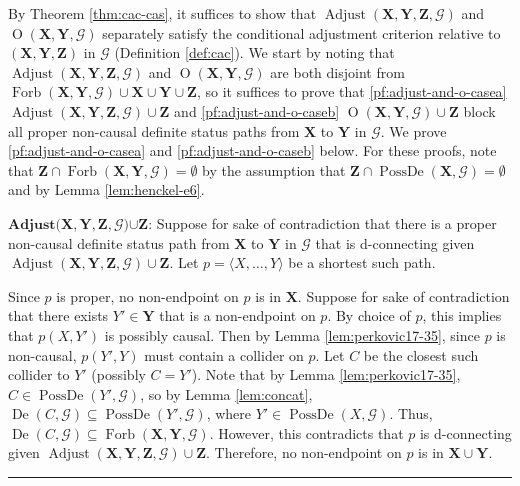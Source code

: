 \documentclass[twoside]{article}
\DeclareMathOperator{\De}{De}
\DeclareMathOperator{\PossDe}{PossDe}
\DeclareMathOperator{\Forb}{Forb}
\newcommand{\fb}[2][X,Y]{\Forb(\mb{#1},#2)}
\DeclareMathOperator{\Adjust}{Adjust}
\newcommand{\adjustb}[2][X,Y,Z]{\Adjust(\mb{#1},#2)}
\DeclareMathOperator{\Opt}{O}
\newcommand{\optb}[2][X,Y]{\Opt(\mb{#1},#2)}
\newcommand{\mb}[1]{\mathbf{#1}}
\newcommand{\g}[1][G]{\mathcal{#1}}
\newenvironment{proofof}[1][]{\begin{trivlist}
\item[\hskip \labelsep {\bfseries Proof of #1.}]}{\hfill\BlackBox\end{trivlist}}
\newcommand{\BlackBox}{\rule{1.5ex}{1.5ex}}
\begin{document}
\begin{proofof}[Theorem \ref{thm:adjust-and-o}]
    By Theorem \ref{thm:cac-cas}, it suffices to show that $\adjustb{\g}$ and $\optb{\g}$ separately satisfy the conditional adjustment criterion relative to $(\mb{X,Y,Z})$ in $\g$ (Definition \ref{def:cac}). We start by noting that $\adjustb{\g}$ and $\optb{\g}$ are both disjoint from $\fb{\g} \cup \mb{X} \cup \mb{Y} \cup \mb{Z}$, so it suffices to prove that \ref{pf:adjust-and-o-casea} $\adjustb{\g} \cup \mb{Z}$ and \ref{pf:adjust-and-o-caseb} $\optb{\g} \cup \mb{Z}$ block all proper non-causal definite status paths from $\mb{X}$ to $\mb{Y}$ in $\g$. We prove \ref{pf:adjust-and-o-casea} and \ref{pf:adjust-and-o-caseb} below. For these proofs, note that $\mb{Z} \cap \fb{\g} = \emptyset$ by the assumption that $\mb{Z} \cap \PossDe(\mb{X}, \g) = \emptyset$ and by Lemma \ref{lem:henckel-e6}. 

        \begin{enumerate*}[label=(\alph*)]
        \item\label{pf:adjust-and-o-casea}
        $\textbf{Adjust(}\mb{X,Y,Z}, \pmb{\g} \textbf{)} \pmb{\cup} \mb{Z} \textbf{:}$ Suppose for sake of contradiction that there is a proper non-causal definite status path from $\mb{X}$ to $\mb{Y}$ in $\g$ that is d-connecting given $\adjustb{\g} \cup \mb{Z}$. Let $p = \langle X, \dots, Y \rangle$ be a shortest such path.
        \end{enumerate*}

        Since $p$ is proper, no non-endpoint on $p$ is in $\mb{X}$. Suppose for sake of contradiction that there exists $Y' \in \mb{Y}$ that is a non-endpoint on $p$. By choice of $p$, this implies that $p(X,Y')$ is possibly causal. Then by Lemma \ref{lem:perkovic17-35}, since $p$ is non-causal, $p(Y',Y)$ must contain a collider on $p$. Let $C$ be the closest such collider to $Y'$ (possibly $C=Y'$). Note that by Lemma \ref{lem:perkovic17-35}, $C \in \PossDe(Y',\g)$, so by Lemma \ref{lem:concat}, $\De(C,\g) \subseteq \PossDe(Y',\g)$, where $Y' \in \PossDe(X,\g)$. Thus, $\De(C,\g) \subseteq \fb{\g}$. However, this contradicts that $p$ is d-connecting given $\adjustb{\g} \cup \mb{Z}$. Therefore, no non-endpoint on $p$ is in $\mb{X} \cup \mb{Y}$.


\end{proofof}
\end{document}
